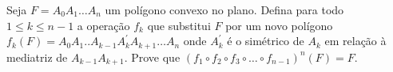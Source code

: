 Seja \(F = A_0 A_1 \dots A_n\) um polígono convexo no plano. Defina para todo \(1 \leq k \leq n-1\) a operação \(f_k\) que substitui \(F\) por um novo polígono \(f_k(F)=A_0A_1..A_{k-1}A_k^\prime A_{k+1} \dots A_n\) onde \(A_k^\prime\) é o simétrico de \(A_k\) em relação à mediatriz de \(A_{k-1}A_{k+1}\). Prove que \((f_1 \circ f_2 \circ f_3 \circ\dots\circ f_{n-1})^n(F)=F\).
